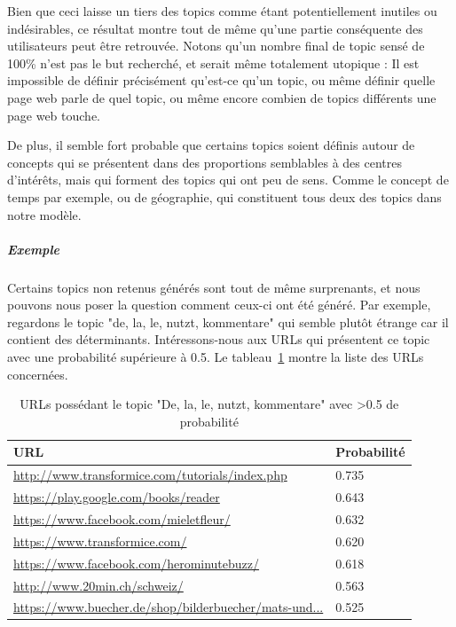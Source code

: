 				Bien que ceci laisse un tiers des topics comme étant potentiellement inutiles ou indésirables, ce résultat montre tout de même qu'une partie conséquente des utilisateurs peut être retrouvée. Notons qu'un nombre final de topic sensé de 100\% n'est pas le but recherché, et serait même totalement utopique : Il est impossible de définir précisément qu'est-ce qu'un topic, ou même définir quelle page web parle de quel topic, ou même encore combien de topics différents une page web touche.

				De plus, il semble fort probable que certains topics soient définis autour de concepts qui se présentent dans des proportions semblables à des centres d'intérêts, mais qui forment des topics qui ont peu de sens. Comme le concept de temps par exemple, ou de géographie, qui constituent tous deux des topics dans notre modèle.

				\subparagraph{Exemple}

					Certains topics non retenus générés sont tout de même surprenants, et nous pouvons nous poser la question comment ceux-ci ont été généré. Par exemple, regardons le topic "de, la, le, nutzt, kommentare" qui semble plutôt étrange car il contient des déterminants. Intéressons-nous aux URLs qui présentent ce topic avec une probabilité supérieure à 0.5. Le tableau~\ref{r-exemple1} montre la liste des URLs concernées.

					\begin{table}[]
\centering
\begin{tabular}{ll}
\textbf{URL}                                          & \textbf{Probabilité} \\ \hline
\scriptsize \url{http://www.transformice.com/tutorials/index.php}       & 0.735             \\
\scriptsize \url{https://play.google.com/books/reader}                  & 0.643             \\
\scriptsize \url{https://www.facebook.com/mieletfleur/}                 & 0.632             \\
\scriptsize \url{https://www.transformice.com/}                         & 0.620             \\
\scriptsize \url{https://www.facebook.com/herominutebuzz/}              & 0.618             \\
\scriptsize \url{http://www.20min.ch/schweiz/}                          & 0.563             \\
\scriptsize \url{https://www.buecher.de/shop/bilderbuecher/mats-und...} & 0.525       
\end{tabular}
\caption{URLs possédant le topic "De, la, le, nutzt, kommentare" avec >0.5 de probabilité}
\label{r-exemple1}
\end{table}

